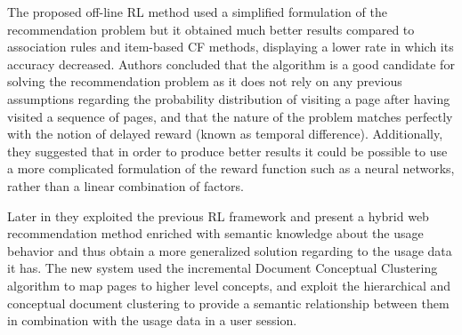 The proposed off-line RL method used a simplified formulation of the recommendation problem but it obtained much better results compared to association rules and item-based CF methods, displaying a lower rate in which its accuracy decreased. Authors concluded that the algorithm is a good candidate for solving the recommendation problem as it does not rely on any previous assumptions regarding the probability distribution of visiting a page after having visited a sequence of pages, and that the nature of the problem matches perfectly with the notion of delayed reward (known as temporal difference). Additionally, they suggested that in order to produce better results it could be possible to use a more complicated formulation of the reward function such as a neural networks, rather than a linear combination of factors.

Later in \cite{taghipour2008hybrid} they exploited the previous RL framework and present a hybrid web recommendation method enriched with semantic knowledge about the usage behavior and thus obtain a more generalized solution regarding to the usage data it has. The new system used the incremental Document Conceptual Clustering \cite{godoy2006modeling} algorithm to map pages to higher level concepts, and exploit the hierarchical and conceptual document clustering to provide a semantic relationship between them in combination with the usage data in a user session.

